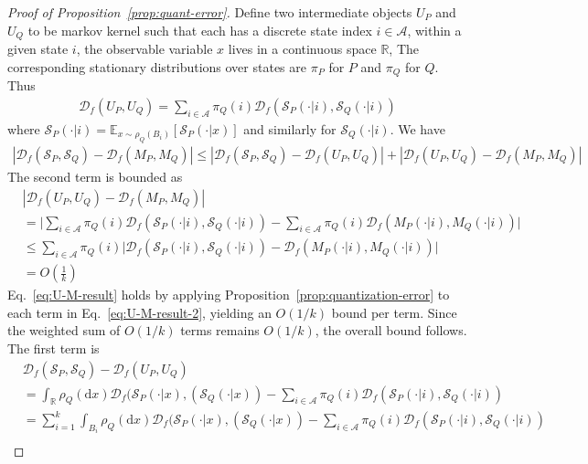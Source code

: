 \documentclass{article}
\theoremstyle{plain}
\theoremstyle{definition}
\theoremstyle{remark}
\begin{document}
\begin{proof}[Proof of Proposition~\ref{prop:quant-error}]
     
    Define two intermediate objects $U_P$ and $U_Q$ to be markov kernel such that each has a discrete state index $i\in \mathcal{A}$, within a given state $i$, the observable variable $x$ lives in a continuous space $\mathbb{R}$, The corresponding stationary distributions over states are $\pi_P$ for $P$ and $\pi_Q$ for $Q$. Thus 
    \begin{align}
    \mathcal{D}_f(U_P,U_Q) = \sum_{i \in \mathcal{A}} \pi_Q(i) \mathcal{D}_f(\mathcal{S}_P(\cdot|i),\mathcal{S}_Q(\cdot|i)) 
    \end{align}
    where $\mathcal{S}_P(\cdot|i)=\mathbb{E}_{x\sim \rho_Q(B_i)}[\mathcal{S}_P(\cdot|x)]$ and similarly for $\mathcal{S}_Q(\cdot|i)$. We have
    \begin{align}
    |\mathcal{D}_f(\mathcal{S}_P,\mathcal{S}_Q)-\mathcal{D}_f(M_P,M_Q)| \le |\mathcal{D}_f(\mathcal{S}_P,\mathcal{S}_Q)-\mathcal{D}_f(U_P,U_Q)|+|\mathcal{D}_f(U_P,U_Q)-\mathcal{D}_f(M_P,M_Q)|
    \end{align}
    The second term is bounded as
    \begin{align}
        &|\mathcal{D}_f(U_P,U_Q)-\mathcal{D}_f(M_P,M_Q)| \\&= \Big|\sum_{i \in \mathcal{A}} \pi_Q(i) \mathcal{D}_f(\mathcal{S}_P(\cdot|i),\mathcal{S}_Q(\cdot|i)) -\sum_{i\in \mathcal{A}} \pi_Q(i) \mathcal{D}_f(M_P(\cdot|i),M_Q(\cdot|i))\Big| \\
        &\le \sum_{i\in \mathcal{A}} \pi_Q(i)\Big|\mathcal{D}_f(\mathcal{S}_P(\cdot|i),\mathcal{S}_Q(\cdot|i)) -\mathcal{D}_f(M_P(\cdot|i),M_Q(\cdot|i))\Big| \label{eq:U-M-result-2}\\
        & = O(\frac{1}{k}) \label{eq:U-M-result}
    \end{align}
    Eq.~\ref{eq:U-M-result} holds by applying Proposition~\ref{prop:quantization-error} to each term in Eq.~\ref{eq:U-M-result-2}, yielding an $O(1/k)$ bound per term. Since the weighted sum of $O(1/k)$ terms remains $O(1/k)$, the overall bound follows. The first term is 
    \begin{align}
     &\mathcal{D}_f(\mathcal{S}_P,\mathcal{S}_Q)-\mathcal{D}_f(U_P,U_Q) \\&=  \int_{\mathbb{R}}\rho_Q(\text{d}x) \mathcal{D}_f (\mathcal{S}_P(\cdot|x),(\mathcal{S}_Q(\cdot|x)) - \sum_{i \in \mathcal{A}} \pi_Q(i) \mathcal{D}_f(\mathcal{S}_P(\cdot|i),\mathcal{S}_Q(\cdot|i)) \\
     & = \sum_{i=1}^k \int_{B_i} \rho_Q(\text{d}x) \mathcal{D}_f (\mathcal{S}_P(\cdot|x),(\mathcal{S}_Q(\cdot|x))- \sum_{i \in \mathcal{A}} \pi_Q(i) \mathcal{D}_f(\mathcal{S}_P(\cdot|i),\mathcal{S}_Q(\cdot|i)) \\

\end{align}
\end{proof}
\end{document}
